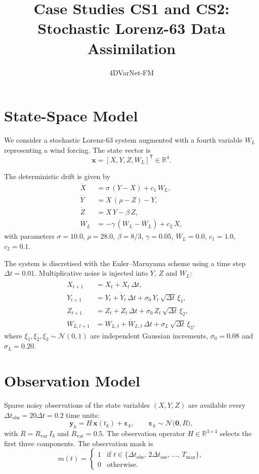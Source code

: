 \documentclass[11pt,a4paper]{article}
\title{Case Studies CS1 and CS2:\\Stochastic Lorenz-63 Data Assimilation}
\author{4DVarNet-FM}
\date{}
\begin{document}
\maketitle

\section{State-Space Model}

We consider a stochastic Lorenz-63 system augmented with a fourth variable $W_L$ representing a wind forcing. The state vector is
\[
\mathbf{x} = [X, Y, Z, W_L]^{\mathsf T} \in \mathbb{R}^{4}.
\]

The deterministic drift is given by
\begin{align}
\dot X &= \sigma\,(Y - X) + c_1\,W_L,\\
\dot Y &= X\,(\rho - Z) - Y,\\
\dot Z &= X\,Y - \beta\,Z,\\
\dot W_L &= -\gamma\,(W_L - \overline W_L) + c_2\,X,
\end{align}
with parameters $\sigma = 10.0$, $\rho = 28.0$, $\beta = 8/3$, $\gamma = 0.05$, $\overline W_L = 0.0$, $c_1 = 1.0$, $c_2 = 0.1$.

The system is discretised with the Euler--Maruyama scheme using a time step $\Delta t = 0.01$. Multiplicative noise is injected into $Y$, $Z$ and $W_L$:
\begin{align}
X_{t+1} &= X_t + \dot X_t\,\Delta t,\\
Y_{t+1} &= Y_t + \dot Y_t\,\Delta t + \sigma_0\,Y_t\,\sqrt{\Delta t}\,\xi_1,\\
Z_{t+1} &= Z_t + \dot Z_t\,\Delta t + \sigma_0\,Z_t\,\sqrt{\Delta t}\,\xi_2,\\
W_{L,t+1} &= W_{L,t} + \dot W_{L,t}\,\Delta t + \sigma_L\,\sqrt{\Delta t}\,\xi_3,
\end{align}
where $\xi_1, \xi_2, \xi_3 \sim \mathcal{N}(0,1)$ are independent Gaussian increments, $\sigma_0 = 0.08$ and $\sigma_L = 0.20$.

\section{Observation Model}

Sparse noisy observations of the state variables $(X,Y,Z)$ are available every $\Delta t_{\text{obs}}=20\Delta t = 0.2$ time units:
\[
\mathbf{y}_k = H\,\mathbf{x}(t_k) + \boldsymbol\varepsilon_k,\qquad
\boldsymbol\varepsilon_k \sim \mathcal{N}\bigl(\mathbf{0}, R\bigr),
\]
with $R = R_{\text{var}}\,I_3$ and $R_{\text{var}} = 0.5$. The observation operator $H\in\mathbb{R}^{3\times4}$ selects the first three components. The observation mask is
\[
m(t) = \begin{cases}
1 & \text{if } t \in \{\Delta t_{\text{obs}},\,2\Delta t_{\text{oss}},\,\dots,\,T_{\max}\},\\
0 & \text{otherwise}.
\end{cases}
\]
\end{document}
